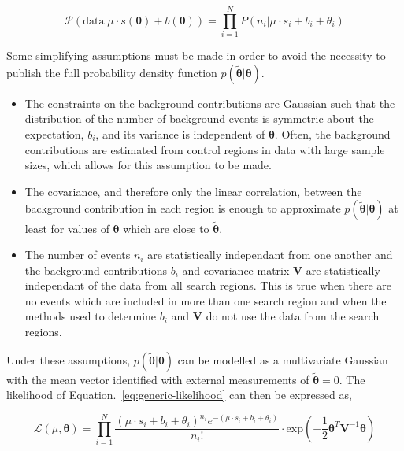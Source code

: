 \begin{equation}
\mathcal{P}(\mathrm{data}|\mu\cdot s(\boldsymbol{\theta}) + b(\boldsymbol{\theta})) = \prod_{i=1}^{N} P(n_{i}|\mu \cdot s_{i}+b_{i}+\theta_{i})
\label{eq:poisson-prob}
\end{equation}

Some simplifying assumptions must be made in order to avoid the necessity to publish the full probability density function $p(\tilde{\boldsymbol{\theta}}|\boldsymbol{\theta})$. 

\begin{itemize}
\item{The constraints on the background contributions are Gaussian such that the distribution of the number of background events is symmetric about the expectation, $b_{i}$, 
and its variance is independent of $\boldsymbol{\theta}$. Often, the background contributions are estimated from control regions in data with large sample sizes, which allows for this 
assumption to be made.}

\item{The covariance, and therefore only the linear correlation, between the background contribution in each region is enough to approximate $p(\tilde{\boldsymbol{\theta}}|\boldsymbol{\theta})$ 
at least for values of $\boldsymbol{\theta}$ which are close to $\tilde{\boldsymbol{\theta}}$.}

\item{The number of events $n_{i}$ are statistically independant from one another and the background contributions $b_{i}$ and covariance matrix $\mathrm{\mathbf{V}}$ are 
statistically independant of the data from all search regions. This is true when there are no events which are included in more than one search region and when the methods used to 
determine $b_{i}$ and $\mathrm{\mathbf{V}}$ do not use the data from the search regions.}
\end{itemize}

Under these assumptions, $p(\tilde{\boldsymbol{\theta}}|\boldsymbol{\theta})$ can be modelled as a multivariate Gaussian with the mean vector identified with external measurements of 
$\tilde{\boldsymbol{\theta}}=0$. The likelihood of Equation.~\ref{eq:generic-likelihood} can then be expressed as,

\begin{equation}
\mathcal{L}(\mu, \boldsymbol{\theta}) =  \prod_{i=1}^{N} \dfrac{(\mu \cdot s_{i}+b_{i}+\theta_{i})^{n_{i}} e^{-(\mu \cdot s_{i}+b_{i}+\theta_{i})} }{n_{i}!} \cdot  
\mathrm{exp}\left(-\dfrac{1}{2} \boldsymbol{\theta}^{T}\mathrm{\mathbf{V}}^{-1}\boldsymbol{\theta} \right)
\label{eq:full-likelihood}
\end{equation}

